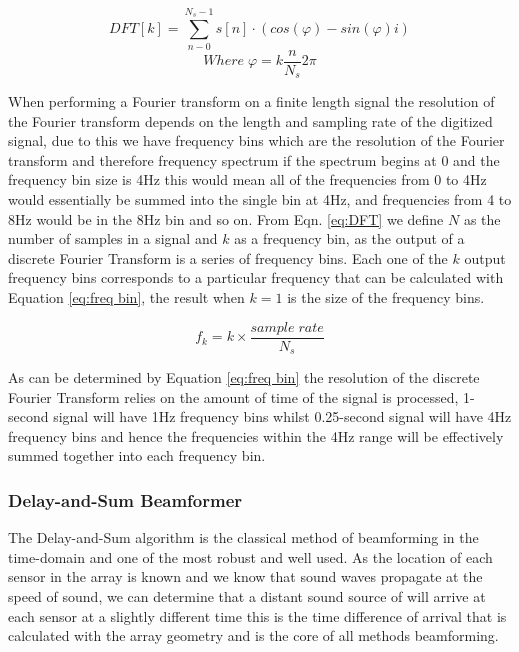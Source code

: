 \documentclass{UoNMCHA}
\numberwithin{equation}{section}
\begin{document}
    \begin{equation}
        DFT[k]=\sum_{n-0}^{N_s-1}s[n] \cdot (cos(\varphi) - sin(\varphi)i)
        \label{eq:DFT}
    \end{equation}
        \begin{equation*}
        Where \; \varphi = k \frac{n}{N_s}2 \pi
    \end{equation*}
    
    When performing a Fourier transform on a finite length signal the resolution of the Fourier transform depends on the length and sampling rate of the digitized signal, due to this we have frequency bins which are the resolution of the Fourier transform and therefore frequency spectrum if the spectrum begins at 0 and the frequency bin size is 4Hz this would mean all of the frequencies from 0 to 4Hz would essentially be summed into the single bin at 4Hz, and frequencies from 4 to 8Hz would be in the 8Hz bin and so on. From Eqn. \ref{eq:DFT} we define $N$ as the number of samples in a signal and $k$ as a frequency bin, as the output of a discrete Fourier Transform is a series of frequency bins. Each one of the $k$ output frequency bins corresponds to a particular frequency that can be calculated with Equation \ref{eq:freq bin}, the result when $k=1$ is the size of the frequency bins.
    
    \begin{equation}
        f_k = k \times \frac{sample\;rate}{N_s}
        \label{eq:freq bin}
    \end{equation}
    
    As can be determined by Equation \ref{eq:freq bin} the resolution of the discrete Fourier Transform relies on the amount of time of the signal is processed, 1-second signal will have 1Hz frequency bins whilst 0.25-second signal will have 4Hz frequency bins and hence the frequencies within the 4Hz range will be effectively summed together into each frequency bin.
    
\subsubsection{Delay-and-Sum Beamformer} \label{sec:DAS Algorithm}
    The Delay-and-Sum algorithm is the classical method of beamforming in the time-domain and one of the most robust and well used. As the location of each sensor in the array is known and we know that sound waves propagate at the speed of sound, we can determine that a distant sound source of will arrive at each sensor at a slightly different time this is the time difference of arrival that is calculated with the array geometry and is the core of all methods beamforming.
    
\end{document}
